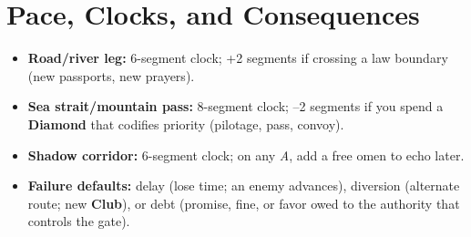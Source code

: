 \documentclass[11pt]{article}
\newcommand{\SuitClub}{\textbf{Club}}   %
\newcommand{\SuitDiamond}{\textbf{Diamond}} %
\begin{document}
\section{Pace, Clocks, and Consequences}
\begin{itemize}
  \item \textbf{Road/river leg:} 6-segment clock; +2 segments if crossing a law boundary (new passports, new prayers).
  \item \textbf{Sea strait/mountain pass:} 8-segment clock; --2 segments if you spend a \SuitDiamond{} that codifies priority (pilotage, pass, convoy).
  \item \textbf{Shadow corridor:} 6-segment clock; on any \emph{A}, add a free omen to echo later.
  \item \textbf{Failure defaults:} delay (lose time; an enemy advances), diversion (alternate route; new \SuitClub{}), or debt (promise, fine, or favor owed to the authority that controls the gate).
\end{itemize}
\end{document}
